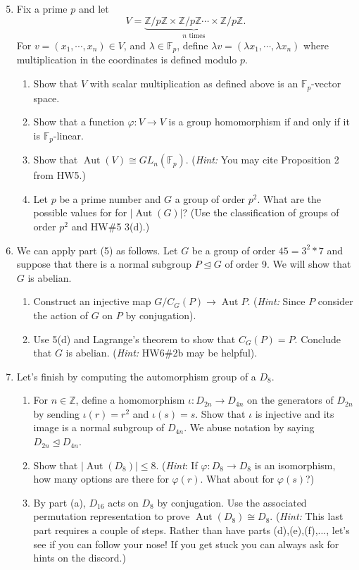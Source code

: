\documentclass[11pt]{article}
\newcommand{\Aut}{\operatorname{Aut}}
\newcommand{\bF}{\mathbb{F}}
\newcommand{\bZ}{\mathbb{Z}}
\begin{document}
\begin{enumerate}
  \setcounter{enumi}{4}
  \item Fix a prime $p$ and let
  \[V = \underbrace{\bZ/p\bZ\times\bZ/p\bZ\cdots\times\bZ/p\bZ}_{n\text{ times}}.\]
  For $v = (x_1,\cdots,x_n)\in V$, and $\lambda\in\bF_p$, define $\lambda v = (\lambda x_1,\cdots,\lambda x_n)$ where multiplication in the coordinates is defined modulo $p$.
  \begin{enumerate}
    \item Show that $V$ with scalar multiplication as defined above is an $\bF_p$-vector space.
    \item Show that a function $\varphi:V\to V$ is a group homomorphism if and only if it is $\bF_p$-linear.
    \item Show that $\Aut(V)\cong GL_n(\bF_p)$.  (\textit{Hint:} You may cite Proposition 2 from HW5.)
    \item Let $p$ be a prime number and $G$ a group of order $p^2$.  What are the possible values for for $|\Aut(G)|$?  (Use the classification of groups of order $p^2$ and HW\#5 3(d).)
  \end{enumerate}
  \item We can apply part (5) as follows.  Let $G$ be a group of order $45 = 3^2*7$ and suppose that there is a normal subgroup $P\unlhd G$ of order 9.  We will show that $G$ is abelian.
  \begin{enumerate}
    \item Construct an injective map $G/C_G(P)\to\Aut P$.  (\textit{Hint:} Since $P$ consider the action of $G$ on $P$ by conjugation).
    \item Use 5(d) and Lagrange's theorem to show that $C_G(P) = P$.  Conclude that $G$ is abelian.  (\textit{Hint:} HW6\#2b may be helpful).
  \end{enumerate}
  \item Let's finish by computing the automorphism group of a $D_8$.
  \begin{enumerate}
    \item For $n\in\bZ$, define a homomorphism $\iota:D_{2n}\to D_{4n}$ on the generators of $D_{2n}$ by sending $\iota(r)=r^2$ and $\iota(s)=s$.  Show that $\iota$ is injective and its image is a normal subgroup of $D_{4n}$.  We abuse notation by saying $D_{2n}\unlhd D_{4n}$.
    \item Show that $|\Aut(D_8)|\le 8$.  (\textit{Hint}: If $\varphi:D_8\to D_8$ is an isomorphism, how many options are there for $\varphi(r)$.  What about for $\varphi(s)$?)
    \item By part (a), $D_{16}$ acts on $D_8$ by conjugation.  Use the associated permutation representation to prove $\Aut(D_8) \cong D_8$.  (\textit{Hint:} This last part requires a couple of steps.  Rather than have parts (d),(e),(f),..., let's see if you can follow your nose!  If you get stuck you can always ask for hints on the discord.)
  \end{enumerate}
\end{enumerate}
\end{document}
